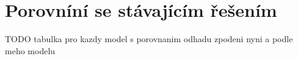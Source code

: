 \chapter{Porovníní se stávajícím řešením}

TODO tabulka pro kazdy model s porovnanim odhadu zpodeni nyni a podle meho modelu
